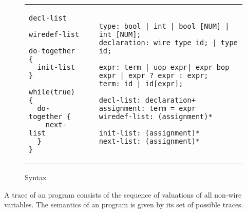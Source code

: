 \begin{figure}
\begin{tabular}{p{3cm}p{0.5cm}p{12cm}}
\begin{lstlisting}
decl-list

wiredef-list

do-together {
  init-list 
}

while(true) {
  do-together {
    next-list
  } 
}
\end{lstlisting}
&
&
\begin{lstlisting}
type: bool | int | bool [NUM] | int [NUM]; 
declaration: wire type id; | type id;

expr: term | uop expr| expr bop expr | expr ? expr : expr;
term: id | id[expr]; 

decl-list: declaration+
assignment: term = expr
wiredef-list: (assignment)*

init-list: (assignment)* 
next-list: (assignment)* 
\end{lstlisting}
\end{tabular}
\caption{\caig Syntax}
\label{fig:gr}
\end{figure}


\begin{definition}
A trace of an \caig program consists of the sequence of valuations of all non-wire variables. The semantics of an \caig program is given by its set of possible traces.  
\end{definition}
